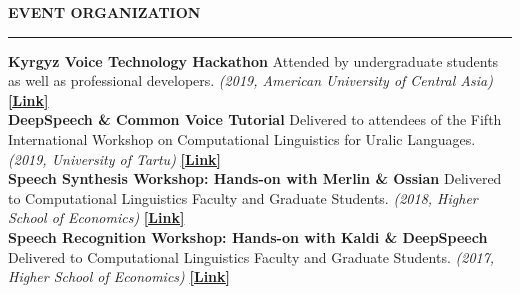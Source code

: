 \documentclass{resume} %
\begin{document}

\begin{minipage}{\textwidth}
\sectionskip
\MakeUppercase{\textbf{Event Organization}}
  \sectionlineskip
  \hrule
\vspace{.5cm}

{\bf Kyrgyz Voice Technology Hackathon} {Attended by undergraduate students as well as professional developers.} {\em (2019, American University of Central Asia)} \hfill {\href{https://jrmeyer.github.io/kyrgyz-voice-hackathon/}{\textbf{[Link]}}} \\

{\bf DeepSpeech \& Common Voice Tutorial} {Delivered to attendees of the Fifth International Workshop on Computational Linguistics for Uralic Languages.} {\em (2019, University of Tartu)} \hfill { \href{https://sisu.ut.ee/iwclul2019/avaleht}{\textbf{[Link]}}} \\

{\bf Speech Synthesis Workshop: Hands-on with Merlin \& Ossian} {Delivered to Computational Linguistics Faculty and Graduate Students.} {\em (2018, Higher School of Economics)} \hfill {\href{http://jrmeyer.github.io/tts/2016/12/09/tts-workshop.html}{\textbf{[Link]}}} \\

{\bf Speech Recognition Workshop: Hands-on with Kaldi \& DeepSpeech} {Delivered to Computational Linguistics Faculty and Graduate Students.} {\em (2017, Higher School of Economics)} \hfill {\href{http://jrmeyer.github.io/misc/stt-vishka.pdf}{\textbf{[Link]}}}\\

\end{minipage}




\end{document}
